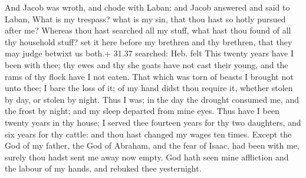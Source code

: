  And Jacob was wroth, and chode with Laban: and Jacob
answered and said to Laban, What is my trespass? what is my sin, that
thou hast so hotly pursued after me?  Whereas thou hast
searched all my stuff, what hast thou found of all thy household stuff?
set it here before my brethren and thy brethren, that they may judge
betwixt us both.+ 31.37 searched: Heb. felt  This twenty
years have I been with thee; thy ewes and thy she goats have not cast
their young, and the rams of thy flock have I not eaten. 
That which was torn of beasts I brought not unto thee; I bare the loss
of it; of my hand didst thou require it, whether stolen by day, or
stolen by night.  Thus I was; in the day the drought
consumed me, and the frost by night; and my sleep departed from mine
eyes.  Thus have I been twenty years in thy house; I served
thee fourteen years for thy two daughters, and six years for thy cattle:
and thou hast changed my wages ten times.  Except the God
of my father, the God of Abraham, and the fear of Isaac, had been with
me, surely thou hadst sent me away now empty. God hath seen mine
affliction and the labour of my hands, and rebuked thee yesternight.

